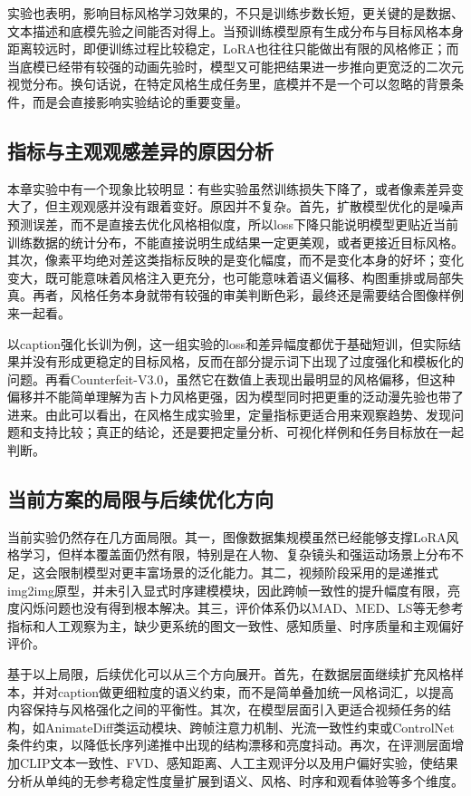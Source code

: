 实验也表明，影响目标风格学习效果的，不只是训练步数长短，更关键的是数据、文本描述和底模先验之间能否对得上。当预训练模型原有生成分布与目标风格本身距离较远时，即便训练过程比较稳定，LoRA也往往只能做出有限的风格修正\cite{ref40}；而当底模已经带有较强的动画先验时，模型又可能把结果进一步推向更宽泛的二次元视觉分布。换句话说，在特定风格生成任务里，底模并不是一个可以忽略的背景条件，而是会直接影响实验结论的重要变量。

\subsection{指标与主观观感差异的原因分析}

本章实验中有一个现象比较明显：有些实验虽然训练损失下降了，或者像素差异变大了，但主观观感并没有跟着变好。原因并不复杂。首先，扩散模型优化的是噪声预测误差，而不是直接去优化风格相似度，所以loss下降只能说明模型更贴近当前训练数据的统计分布，不能直接说明生成结果一定更美观，或者更接近目标风格。其次，像素平均绝对差这类指标反映的是变化幅度，而不是变化本身的好坏；变化变大，既可能意味着风格注入更充分，也可能意味着语义偏移、构图重排或局部失真。再者，风格任务本身就带有较强的审美判断色彩，最终还是需要结合图像样例来一起看。

以caption强化长训为例，这一组实验的loss和差异幅度都优于基础短训，但实际结果并没有形成更稳定的目标风格，反而在部分提示词下出现了过度强化和模板化的问题。再看Counterfeit-V3.0，虽然它在数值上表现出最明显的风格偏移，但这种偏移并不能简单理解为吉卜力风格更强，因为模型同时把更重的泛动漫先验也带了进来。由此可以看出，在风格生成实验里，定量指标更适合用来观察趋势、发现问题和支持比较；真正的结论，还是要把定量分析、可视化样例和任务目标放在一起判断。

\subsection{当前方案的局限与后续优化方向}

当前实验仍然存在几方面局限。其一，图像数据集规模虽然已经能够支撑LoRA风格学习，但样本覆盖面仍然有限，特别是在人物、复杂镜头和强运动场景上分布不足，这会限制模型对更丰富场景的泛化能力。其二，视频阶段采用的是递推式img2img原型，并未引入显式时序建模模块，因此跨帧一致性的提升幅度有限，亮度闪烁问题也没有得到根本解决。其三，评价体系仍以MAD、MED、LS等无参考指标和人工观察为主，缺少更系统的图文一致性、感知质量、时序质量和主观偏好评价。

基于以上局限，后续优化可以从三个方向展开。首先，在数据层面继续扩充风格样本，并对caption做更细粒度的语义约束，而不是简单叠加统一风格词汇，以提高内容保持与风格强化之间的平衡性。其次，在模型层面引入更适合视频任务的结构，如AnimateDiff类运动模块、跨帧注意力机制、光流一致性约束或ControlNet条件约束，以降低长序列递推中出现的结构漂移和亮度抖动。再次，在评测层面增加CLIP文本一致性、FVD、感知距离、人工主观评分以及用户偏好实验，使结果分析从单纯的无参考稳定性度量扩展到语义、风格、时序和观看体验等多个维度。

